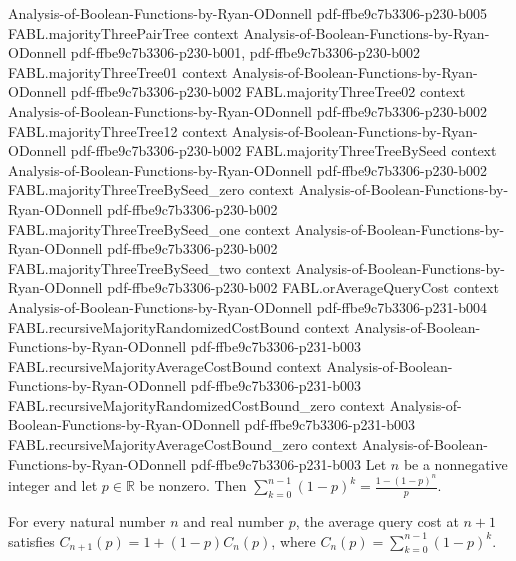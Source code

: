 \begin{theorem}
  {Analysis-of-Boolean-Functions-by-Ryan-ODonnell}
  {pdf-ffbe9c7b3306-p230-b005}
\proofstep
  {FABL.majorityThreePairTree}
  {context}
  {Analysis-of-Boolean-Functions-by-Ryan-ODonnell}
  {pdf-ffbe9c7b3306-p230-b001,
    pdf-ffbe9c7b3306-p230-b002}
\proofstep
  {FABL.majorityThreeTree01}
  {context}
  {Analysis-of-Boolean-Functions-by-Ryan-ODonnell}
  {pdf-ffbe9c7b3306-p230-b002}
\proofstep
  {FABL.majorityThreeTree02}
  {context}
  {Analysis-of-Boolean-Functions-by-Ryan-ODonnell}
  {pdf-ffbe9c7b3306-p230-b002}
\proofstep
  {FABL.majorityThreeTree12}
  {context}
  {Analysis-of-Boolean-Functions-by-Ryan-ODonnell}
  {pdf-ffbe9c7b3306-p230-b002}
\proofstep
  {FABL.majorityThreeTreeBySeed}
  {context}
  {Analysis-of-Boolean-Functions-by-Ryan-ODonnell}
  {pdf-ffbe9c7b3306-p230-b002}
\proofstep
  {FABL.majorityThreeTreeBySeed_zero}
  {context}
  {Analysis-of-Boolean-Functions-by-Ryan-ODonnell}
  {pdf-ffbe9c7b3306-p230-b002}
\proofstep
  {FABL.majorityThreeTreeBySeed_one}
  {context}
  {Analysis-of-Boolean-Functions-by-Ryan-ODonnell}
  {pdf-ffbe9c7b3306-p230-b002}
\proofstep
  {FABL.majorityThreeTreeBySeed_two}
  {context}
  {Analysis-of-Boolean-Functions-by-Ryan-ODonnell}
  {pdf-ffbe9c7b3306-p230-b002}
\proofstep
  {FABL.orAverageQueryCost}
  {context}
  {Analysis-of-Boolean-Functions-by-Ryan-ODonnell}
  {pdf-ffbe9c7b3306-p231-b004}
\proofstep
  {FABL.recursiveMajorityRandomizedCostBound}
  {context}
  {Analysis-of-Boolean-Functions-by-Ryan-ODonnell}
  {pdf-ffbe9c7b3306-p231-b003}
\proofstep
  {FABL.recursiveMajorityAverageCostBound}
  {context}
  {Analysis-of-Boolean-Functions-by-Ryan-ODonnell}
  {pdf-ffbe9c7b3306-p231-b003}
\proofstep
  {FABL.recursiveMajorityRandomizedCostBound_zero}
  {context}
  {Analysis-of-Boolean-Functions-by-Ryan-ODonnell}
  {pdf-ffbe9c7b3306-p231-b003}
\proofstep
  {FABL.recursiveMajorityAverageCostBound_zero}
  {context}
  {Analysis-of-Boolean-Functions-by-Ryan-ODonnell}
  {pdf-ffbe9c7b3306-p231-b003}
Let $n$ be a nonnegative integer and let $p\in\mathbb{R}$ be nonzero. Then
$\sum_{k=0}^{n-1}(1-p)^k=\frac{1-(1-p)^n}{p}$.
\end{theorem}

\begin{theorem}
\label{FABL.orAverageQueryCost_succ}
\leanok
{}
For every natural number $n$ and real number $p$, the average query cost at $n+1$
satisfies $C_{n+1}(p)=1+(1-p)C_n(p)$, where $C_n(p)=\sum_{k=0}^{n-1}(1-p)^k$.
\end{theorem}

